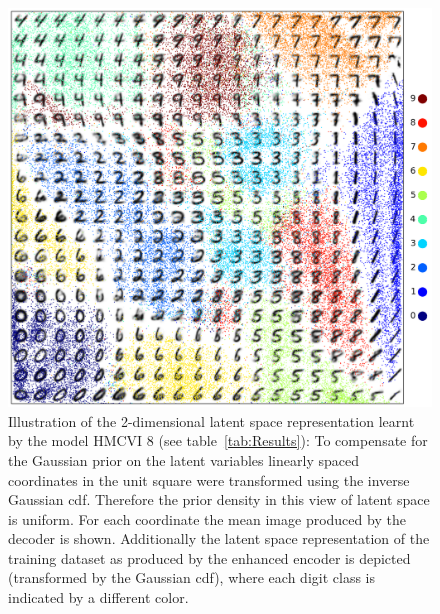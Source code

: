 \begin{appendices}
\begin{figure}[hb]
\centering
\includegraphics[width=\columnwidth]{figures/learned_representation_train_points_small.pdf}
\caption{Illustration of the 2-dimensional latent space representation learnt by the model HMCVI 8 (see table~\ref{tab:Results}): To compensate for the Gaussian prior on the latent variables linearly spaced coordinates in the unit square were transformed using the inverse Gaussian cdf. Therefore the prior density in this view of latent space is uniform. For each coordinate the mean image produced by the decoder is shown. Additionally the latent space representation of the training dataset as produced by the enhanced encoder is depicted (transformed by the Gaussian cdf), where each digit class is indicated by a different color.}
\label{fig:2d_latent_visualization}
\end{figure}

\end{appendices}